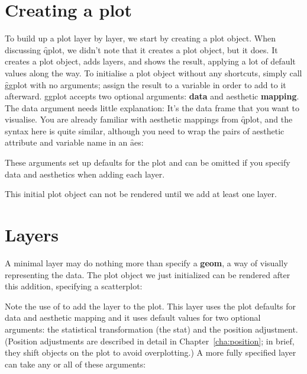 \section{Creating a plot}
\label{sec:ggplot}

To build up a plot layer by layer, we start by creating a plot object. When discussing \f{qplot}, we didn't note that it creates a plot object, but it does. It creates a plot object, adds layers, and shows the result, applying a lot of default values along the way. To initialise a plot object without any shortcuts, simply call \f{ggplot} with no arguments; assign the result to a variable in order to add to it afterward.  ggplot accepts two optional arguments: {\bf data} and aesthetic {\bf mapping}.  The data argument needs little explanation: It's the data frame that you want to visualise.  You are already familiar with aesthetic mappings from \f{qplot}, and the syntax here is quite similar, although you need to wrap the pairs of aesthetic attribute and variable name in an \f{aes}:

% 


These arguments set up defaults for the plot and can be omitted if you specify data and aesthetics when adding each layer. 

This initial plot object can not be rendered until we add at least one layer.

\section{Layers}
\label{sec:layers}

A minimal layer may do nothing more than specify a {\bf geom}, a way of visually representing the data.  The plot object we just initialized can be rendered after this addition, specifying a scatterplot:

% 


\noindent Note the use of \code{+} to add the layer to the plot.  This layer uses the plot defaults for data and aesthetic mapping and it uses default values for two optional arguments: the statistical transformation (the stat) and the position adjustment.  (Position adjustments are described in detail in Chapter~\ref{cha:position}; in brief, they shift objects on the plot to avoid overplotting.)  A more fully specified layer can take any or all of these arguments:

